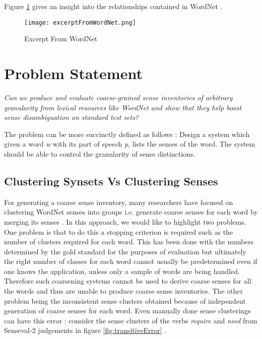 Figure \ref{fig:excerptFromWordNet} gives an insight into the relationships contained in WordNet \citep{navigli2009WSDSurvey}.
\begin{figure}[h]
\begin{center}
\texttt{[image: excerptFromWordNet.png]}
\caption{Excerpt From WordNet}
\label{fig:excerptFromWordNet}
\end{center}
\end{figure}

\section{Problem Statement}
\textit{Can we produce and evaluate coarse-grained sense inventories of arbitrary granularity from lexical resources like WordNet and show that they help boost sense disambiguation on standard test sets?}

The problem can be more succinctly defined as follows : Design a system which given a word \textit{w} with its part of speech \textit{p}, lists the senses of the word. The system should be able to control the granularity of sense distinctions.

\subsection{Clustering Synsets Vs Clustering Senses}
For generating a coarse sense inventory, many researchers have focused on clustering WordNet senses into groups i.e. generate coarse senses for each word by merging its senses \citep{agirre2003clustering} \citep{chklovski2003exploiting} \citep{Navigli06meaningfulclustering}. In this approach, we would like to highlight two problems. One problem is that to do this a stopping criterion is required such as the number of clusters required for each word. This has been done with the numbers determined by the gold standard for the purposes of evaluation \citep{agirre2003clustering} but ultimately the right number of classes for each word cannot usually be predetermined even if one knows the application, unless only a sample of words are being handled. Therefore such coarsening systems cannot be used to derive coarse senses for all the words and thus are unable to produce coarse sense inventories. The other problem being the inconsistent sense clusters obtained because of independent generation of coarse senses for 
each word. Even manually done sense clusterings can have this error : consider the sense clusters of the verbs \textit{require} and \textit{need} from Senseval-2 judgements in figure \ref{fig:transitiveError} \citep{snow07mergesense}.

